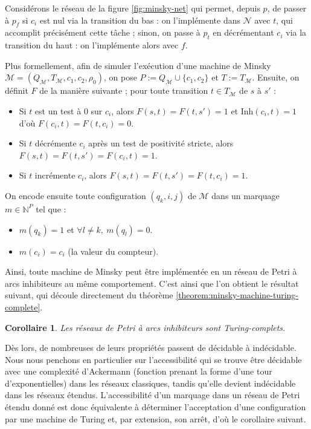 \documentclass{article}
\newtheorem{corollary}{Corollaire}
\theoremstyle{remark}
\theoremstyle{remark}
\newcommand{\inhibitor}{\mathrm{Inh}}
\begin{document}
Considérons le réseau de la figure \ref{fig:minsky-net} qui permet, depuis $p$, de passer à $p_f$ si $c_i$ est nul via la transition du bas : on l'implémente dans $\mathcal{N}$ avec $t$, qui accomplit précisément cette tâche ; sinon, on passe à $p_t$ en décrémentant $c_i$ via la transition du haut : on l'implémente alors avec $f$.

Plus formellement, afin de simuler l'exécution d'une machine de Minsky $\mathcal{M} = (Q_{\mathcal{M}}, T_{\mathcal{M}}, c_1, c_2, \rho_0)$, on pose $P := Q_{\mathcal{M}} \cup \{c_1, c_2\}$ et $T := T_{\mathcal{M}}$. Ensuite, on définit $F$ de la manière suivante ; pour toute transition $t \in T_{\mathcal{M}}$ de $s$ à $s'$ : \begin{itemize}
    \item Si $t$ est un test à 0 sur $c_i$, alors $F(s, t) = F(t, s') = 1$ et $\inhibitor(c_i, t) = 1$ d'où $F(c_i, t) = F(t, c_i) = 0$.
    \item Si $t$ décrémente $c_i$ après un test de positivité stricte, alors $F(s, t) = F(t, s') = F(c_i, t) = 1$.
    \item Si $t$ incrémente $c_i$, alors $F(s, t) = F(t, s') = F(t, c_i) = 1$.
\end{itemize}
On encode ensuite toute configuration $(q_k, i, j)$ de $\mathcal{M}$ dans un marquage $m \in \mathbb{N}^{P}$ tel que : \begin{itemize}
    \item $m(q_k) = 1$ et $\forall l \neq k,\ m(q_l) = 0$.
    \item $m(c_i) = c_i$ (la valeur du compteur).
\end{itemize}
Ainsi, toute machine de Minsky peut être implémentée en un réseau de Petri à arcs inhibiteurs au même comportement. C'est ainsi que l'on obtient le résultat suivant, qui découle directement du théorème \ref{theorem:minsky-machine-turing-complete}.

\begin{corollary}
    Les réseaux de Petri à arcs inhibiteurs sont Turing-complets.
\end{corollary}

Dès lors, de nombreuses de leurs propriétés passent de décidable à indécidable. Nous nous penchons en particulier sur l'accessibilité qui se trouve être décidable avec une complexité d'Ackermann (fonction prenant la forme d'une tour d'exponentielles) dans les réseaux classiques, tandis qu'elle devient indécidable dans les réseaux étendus. L'accessibilité d'un marquage dans un réseau de Petri étendu donné est donc équivalente à déterminer l'acceptation d'une configuration par une machine de Turing et, par extension, son arrêt, d'où le corollaire suivant.
\end{document}
